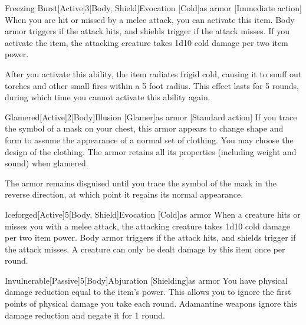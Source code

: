        \begin{magicitemdef}{Freezing Burst}[Active]{3}[Body, Shield]{Evocation [Cold]}{as armor}
            [Immediate action] When you are hit or missed by a melee attack, you can activate this item.
            Body armor triggers if the attack hits, and shields trigger if the attack misses.
            If you activate the item, the attacking creature takes 1d10 cold damage per two item power.

            After you activate this ability, the item radiates frigid cold, causing it to snuff out torches and other small fires within a 5 foot radius.
            This effect lasts for 5 rounds, during which time you cannot activate this ability again.
        \end{magicitemdef}

        \begin{magicitemdef}{Glamered}[Active]{2}[Body]{Illusion [Glamer]}{as armor}
            [Standard action] If you trace the symbol of a mask on your chest, this armor appears to change shape and form to assume the appearance of a normal set of clothing.
            You may choose the design of the clothing.
            The armor retains all its properties (including weight and sound) when glamered.

            The armor remains disguised until you trace the symbol of the mask in the reverse direction, at which point it regains its normal appearance.
        \end{magicitemdef}

        \begin{magicitemdef}{Iceforged}[Active]{5}[Body, Shield]{Evocation [Cold]}{as armor}
             When a creature hits or misses you with a melee attack, the attacking creature takes 1d10 cold damage per two item power.
            Body armor triggers if the attack hits, and shields trigger if the attack misses.
            A creature can only be dealt damage by this item once per round.
        \end{magicitemdef}

        \begin{magicitemdef}{Invulnerable}[Passive]{5}[Body]{Abjuration [Shielding]}{as armor}
             You have physical damage reduction equal to the item's power.
            This allows you to ignore the first points of physical damage you take each round.
            Adamantine weapons ignore this damage reduction and negate it for 1 round.
        \end{magicitemdef}

